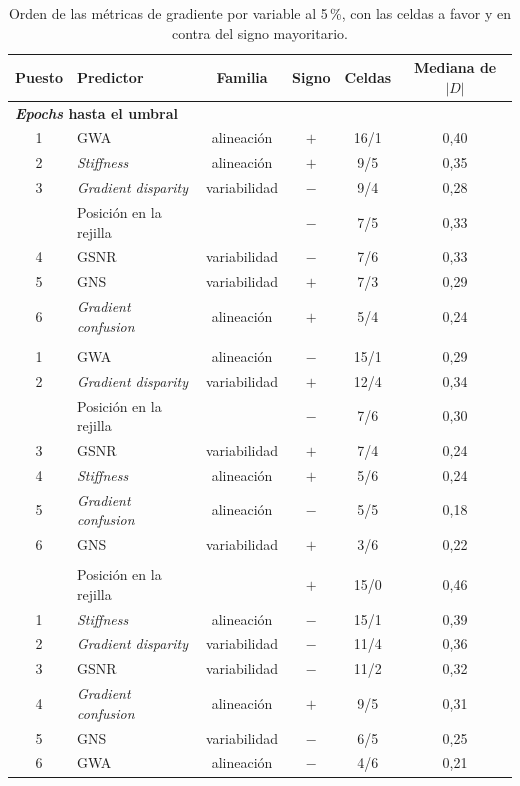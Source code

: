 \begin{table}[ht]
\centering
\footnotesize
\setlength{\tabcolsep}{4pt}
\caption{Orden de las métricas de gradiente por variable al 5\,\%, con las celdas a favor y en contra del signo mayoritario.}
\label{tab:h3}
\begin{tabular}{clcccc}
\toprule
\textbf{Puesto} & \textbf{Predictor} & \textbf{Familia} & \textbf{Signo} & \textbf{Celdas} & \textbf{Mediana de $|D|$} \\
\midrule
\multicolumn{6}{l}{\textbf{\emph{Epochs} hasta el umbral}} \\
1 & GWA & alineación & $+$ & 16/1 & 0,40 \\
2 & \emph{Stiffness} & alineación & $+$ & 9/5 & 0,35 \\
3 & \emph{Gradient disparity} & variabilidad & $-$ & 9/4 & 0,28 \\
  & Posición en la rejilla & & $-$ & 7/5 & 0,33 \\
4 & GSNR & variabilidad & $-$ & 7/6 & 0,33 \\
5 & GNS & variabilidad & $+$ & 7/3 & 0,29 \\
6 & \emph{Gradient confusion} & alineación & $+$ & 5/4 & 0,24 \\
\addlinespace
\multicolumn{6}{l}{\textbf{\emph{Accuracy} de test}} \\
1 & GWA & alineación & $-$ & 15/1 & 0,29 \\
2 & \emph{Gradient disparity} & variabilidad & $+$ & 12/4 & 0,34 \\
  & Posición en la rejilla & & $-$ & 7/6 & 0,30 \\
3 & GSNR & variabilidad & $+$ & 7/4 & 0,24 \\
4 & \emph{Stiffness} & alineación & $+$ & 5/6 & 0,24 \\
5 & \emph{Gradient confusion} & alineación & $-$ & 5/5 & 0,18 \\
6 & GNS & variabilidad & $+$ & 3/6 & 0,22 \\
\addlinespace
\multicolumn{6}{l}{\textbf{\emph{Gap} de \emph{loss}}} \\
  & Posición en la rejilla & & $+$ & 15/0 & 0,46 \\
1 & \emph{Stiffness} & alineación & $-$ & 15/1 & 0,39 \\
2 & \emph{Gradient disparity} & variabilidad & $-$ & 11/4 & 0,36 \\
3 & GSNR & variabilidad & $-$ & 11/2 & 0,32 \\
4 & \emph{Gradient confusion} & alineación & $+$ & 9/5 & 0,31 \\
5 & GNS & variabilidad & $-$ & 6/5 & 0,25 \\
6 & GWA & alineación & $-$ & 4/6 & 0,21 \\
\bottomrule
\end{tabular}
\end{table}

